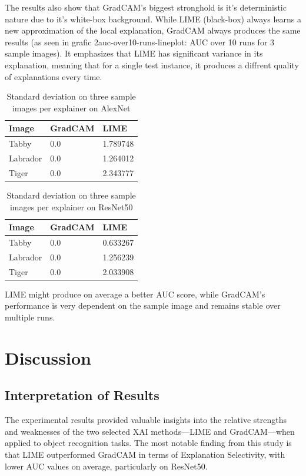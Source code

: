 \documentclass{article}
\begin{document}
The results also show that GradCAM's biggest stronghold is it's deterministic nature due to it's white-box background. While LIME (black-box) always learns a new approximation of the local explanation, GradCAM always produces the same results (as seen in grafic 2{auc-over10-runs-lineplot}: AUC over 10 runs for 3 sample images). It emphasizes that LIME has significant variance in its explanation, meaning that for a single test instance, it produces a diffrent quality of explanations every time.

\begin{table}
    \centering
    \begin{tabular}{lll}
        \hline
        Image       & GradCAM & LIME   \\
        \hline
        Tabby       & 0.0    &  1.789748    \\
        Labrador    & 0.0    &  1.264012    \\
        Tiger       & 0.0    &  2.343777    \\
        \hline
    \end{tabular}
    \caption{Standard deviation on three sample images per explainer on AlexNet}
    \label{tab:table2}
\end{table}

\begin{table}
    \centering
    \begin{tabular}{lll}
        \hline
        Image       & GradCAM & LIME   \\
        \hline
        Tabby       & 0.0    &  0.633267    \\
        Labrador    & 0.0    &  1.256239    \\
        Tiger       & 0.0    &  2.033908    \\
        \hline
    \end{tabular}
    \caption{Standard deviation on three sample images per explainer on ResNet50}
    \label{tab:table3}
\end{table}

LIME might produce on average a better AUC score, while GradCAM's performance is very dependent on the sample image and remains stable over multiple runs. 

\section{Discussion}
\subsection{Interpretation of Results}
The experimental results provided valuable insights into the relative strengths and weaknesses of the two selected XAI methods—LIME and GradCAM—when applied to object recognition tasks. The most notable finding from this study is that LIME outperformed GradCAM in terms of Explanation Selectivity, with lower AUC values on average, particularly on ResNet50.
\end{document}
